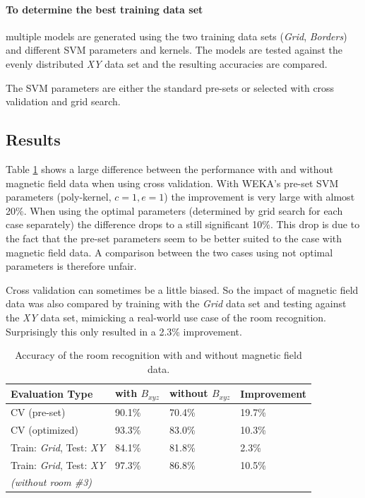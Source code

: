 \paragraph{To determine the best training data set} multiple models are generated using the two training data sets (\emph{Grid}, \emph{Borders}) and different SVM parameters and kernels. The models are tested against the evenly distributed \emph{XY} data set and the resulting accuracies are compared.

The SVM parameters are either the standard pre-sets or selected with cross validation and grid search.

\subsection{Results}

Table \ref{tab:RoomRecognitionMagneticField} shows a large difference between the performance with and without magnetic field data when using cross validation. With WEKA's pre-set SVM parameters (poly-kernel, $c=1,e=1$) the improvement is very large with almost 20\%. When using the optimal parameters (determined by grid search for each case separately) the difference drops to a still significant 10\%. This drop is due to the fact that the pre-set parameters seem to be better suited to the case with magnetic field data. A comparison between the two cases using not optimal parameters is therefore unfair.

Cross validation can sometimes be a little biased. So the impact of magnetic field data was also compared by training with the \emph{Grid} data set and testing against the \emph{XY} data set, mimicking a real-world use case of the room recognition. Surprisingly this only resulted in a 2.3\% improvement.



\begin{table}
\centering
\begin{tabular}{l l l l}
\toprule
\textbf{Evaluation Type}&\textbf{with }\boldmath$B_{xyz}$&\textbf{without }\boldmath$B_{xyz}$&\textbf{Improvement} \\
\midrule
CV (pre-set)&90.1\%&70.4\%&19.7\%\\
CV (optimized)&93.3\%&83.0\%&10.3\%\\
Train: \emph{Grid}, Test: \emph{XY}&84.1\%&81.8\%&2.3\%\\
Train: \emph{Grid}, Test: \emph{XY}&97.3\%&86.8\%&10.5\%\\
\textit{(without room \#3)}&&\\
\bottomrule
\end{tabular}
\caption[Room Recognition - Magnetic Field improvements]{Accuracy of the room recognition with and without magnetic field data.}
\label{tab:RoomRecognitionMagneticField}
\end{table}


